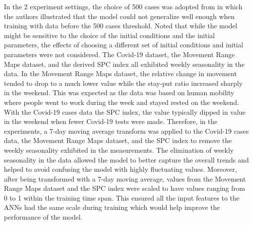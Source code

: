 In the 2 experiment settings, the choice of 500 cases was adopted from \cite{dandekarMachineLearningAidedGlobal2020a} in which the authors illustrated that the model could not generalize well enough when training with data before the 500 cases threshold.
Noted that while the model might be sensitive to the choice of the initial conditions and the initial parameters, the effects of choosing a different set of initial conditions and initial parameters were not considered.
The Covid-19 dataset, the Movement Range Maps dataset, and the derived \gls{SPC} index all exhibited weekly seasonality in the data.
In the Movement Range Maps dataset, the relative change in movement tended to drop to a much lower value while the stay-put ratio increased sharply in the weekend.
This was expected as the data was based on human mobility where people went to work during the week and stayed rested on the weekend.
With the Covid-19 cases data the \gls{SPC} index, the value typically dipped in value in the weekend when fewer Covid-19 tests were made.
Therefore, in the experiments, a 7-day moving average transform was applied to the Covid-19 cases data, the Movement Range Maps dataset, and the \gls{SPC} index to remove the weekly seasonality exhibited in the measurements.
The elimination of weekly seasonality in the data allowed the model to better capture the overall trends and helped to avoid confusing the model with highly fluctuating values.
Moreover, after being transformed with a 7-day moving average, values from the Movement Range Maps dataset and the \gls{SPC} index were scaled to have values ranging from 0 to 1 within the training time span.
This ensured all the input features to the \glspl{ANN} had the same scale during training which would help improve the performance of the model.